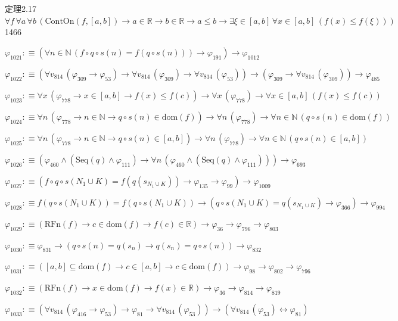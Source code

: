 \begin{fullproof}{定理2.17}{$\forall f\,\forall a\,\forall b\,(\mathrm{ContOn}(f,[a,b]) \to a \in \mathbb{R} \to b \in \mathbb{R} \to a \leq b \to \exists \xi \in [a,b]\,\forall x \in [a,b]\,(f(x) \leq f(\xi)))$}{1466}
\begin{abbrevlist}
\item $\varphi_{1021} :\equiv (\forall n \in \mathbb{N}\,(f \circ q \circ s(n) = f(q \circ s(n))) \to \varphi_{191}) \to \varphi_{1012}$
\item $\varphi_{1022} :\equiv (\forall v_{814}\,(\varphi_{309} \to \varphi_{53}) \to \forall v_{814}\,(\varphi_{309}) \to \forall v_{814}\,(\varphi_{53})) \to (\varphi_{309} \to \forall v_{814}\,(\varphi_{309})) \to \varphi_{485}$
\item $\varphi_{1023} :\equiv \forall x\,(\varphi_{778} \to x \in [a,b] \to f(x) \leq f(c)) \to \forall x\,(\varphi_{778}) \to \forall x \in [a,b]\,(f(x) \leq f(c))$
\item $\varphi_{1024} :\equiv \forall n\,(\varphi_{778} \to n \in \mathbb{N} \to q \circ s(n) \in \mathrm{dom}(f)) \to \forall n\,(\varphi_{778}) \to \forall n \in \mathbb{N}\,(q \circ s(n) \in \mathrm{dom}(f))$
\item $\varphi_{1025} :\equiv \forall n\,(\varphi_{778} \to n \in \mathbb{N} \to q \circ s(n) \in [a,b]) \to \forall n\,(\varphi_{778}) \to \forall n \in \mathbb{N}\,(q \circ s(n) \in [a,b])$
\item $\varphi_{1026} :\equiv (\varphi_{460} \land (\mathrm{Seq}(q) \land \varphi_{111}) \to \forall n\,(\varphi_{460} \land (\mathrm{Seq}(q) \land \varphi_{111}))) \to \varphi_{693}$
\item $\varphi_{1027} :\equiv (f \circ q \circ s(N_{1} \cup K) = f(q(s_{N_{1} \cup K})) \to \varphi_{135} \to \varphi_{99}) \to \varphi_{1009}$
\item $\varphi_{1028} :\equiv f(q \circ s(N_{1} \cup K)) = f(q \circ s(N_{1} \cup K)) \to (q \circ s(N_{1} \cup K) = q(s_{N_{1} \cup K}) \to \varphi_{366}) \to \varphi_{994}$
\item $\varphi_{1029} :\equiv (\mathrm{RFn}(f) \to c \in \mathrm{dom}(f) \to f(c) \in \mathbb{R}) \to \varphi_{36} \to \varphi_{796} \to \varphi_{803}$
\item $\varphi_{1030} :\equiv \varphi_{831} \to (q \circ s(n) = q(s_{n}) \to q(s_{n}) = q \circ s(n)) \to \varphi_{832}$
\item $\varphi_{1031} :\equiv ([a,b] \subseteq \mathrm{dom}(f) \to c \in [a,b] \to c \in \mathrm{dom}(f)) \to \varphi_{98} \to \varphi_{802} \to \varphi_{796}$
\item $\varphi_{1032} :\equiv (\mathrm{RFn}(f) \to x \in \mathrm{dom}(f) \to f(x) \in \mathbb{R}) \to \varphi_{36} \to \varphi_{814} \to \varphi_{819}$
\item $\varphi_{1033} :\equiv (\forall v_{814}\,(\varphi_{416} \to \varphi_{53}) \to \varphi_{81} \to \forall v_{814}\,(\varphi_{53})) \to (\forall v_{814}\,(\varphi_{53}) \leftrightarrow \varphi_{81})$

\end{abbrevlist}
\end{fullproof}
